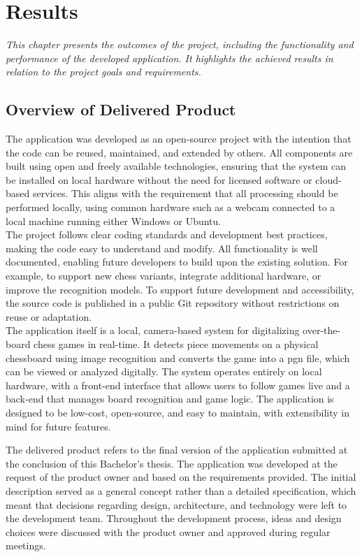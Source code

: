 \chapter{Results}

\begin{center}
    \textit{This chapter presents the outcomes of the project, including the functionality and performance of the developed application. It highlights the achieved results in relation to the project goals and requirements.}
\end{center}

\section{Overview of Delivered Product}
The application was developed as an open-source project with the intention that the code can be reused, maintained, and extended by others. All components are built using open and freely available technologies, ensuring that the system can be installed on local hardware without the need for licensed software or cloud-based services. This aligns with the requirement that all processing should be performed locally, using common hardware such as a webcam connected to a local machine running either Windows or Ubuntu. \\

The project follows clear coding standards and development best practices, making the code easy to understand and modify. All functionality is well documented, enabling future developers to build upon the existing solution. For example, to support new chess variants, integrate additional hardware, or improve the recognition models. To support future development and accessibility, the source code is published in a public Git repository without restrictions on reuse or adaptation. \\

The application itself is a local, camera-based system for digitalizing over-the-board chess games in real-time. It detects piece movements on a physical chessboard using image recognition and converts the game into a \gls{pgn} file, which can be viewed or analyzed digitally. The system operates entirely on local hardware, with a front-end interface that allows users to follow games live and a back-end that manages board recognition and game logic. The application is designed to be low-cost, open-source, and easy to maintain, with extensibility in mind for future features.

The delivered product refers to the final version of the application submitted at the conclusion of this Bachelor’s thesis. The application was developed at the request of the product owner and based on the requirements provided. The initial description served as a general concept rather than a detailed specification, which meant that decisions regarding design, architecture, and technology were left to the development team. Throughout the development process, ideas and design choices were discussed with the product owner and approved during regular meetings.


